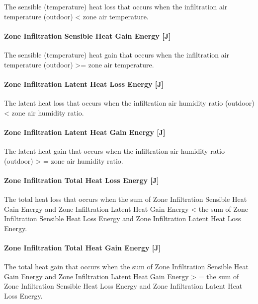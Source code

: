 The sensible (temperature) heat loss that occurs when the infiltration air temperature (outdoor) \textless{} zone air temperature.

\paragraph{Zone Infiltration Sensible Heat Gain Energy {[}J{]}}\label{zone-infiltration-sensible-heat-gain-energy-j}

The sensible (temperature) heat gain that occurs when the infiltration air temperature (outdoor) \textgreater{}= zone air temperature.

\paragraph{Zone Infiltration Latent Heat Loss Energy {[}J{]}}\label{zone-infiltration-latent-heat-loss-energy-j}

The latent heat loss that occurs when the infiltration air humidity ratio (outdoor) \textless{} zone air humidity ratio.

\paragraph{Zone Infiltration Latent Heat Gain Energy {[}J{]}}\label{zone-infiltration-latent-heat-gain-energy-j}

The latent heat gain that occurs when the infiltration air humidity ratio (outdoor) \textgreater{} = zone air humidity ratio.

\paragraph{Zone Infiltration Total Heat Loss Energy {[}J{]}}\label{zone-infiltration-total-heat-loss-energy-j}

The total heat loss that occurs when the sum of Zone Infiltration Sensible Heat Gain Energy and Zone Infiltration Latent Heat Gain Energy \textless{} the sum of Zone Infiltration Sensible Heat Loss Energy and Zone Infiltration Latent Heat Loss Energy.

\paragraph{Zone Infiltration Total Heat Gain Energy {[}J{]}}\label{zone-infiltration-total-heat-gain-energy-j}

The total heat gain that occurs when the sum of Zone Infiltration Sensible Heat Gain Energy and Zone Infiltration Latent Heat Gain Energy \textgreater{} = the sum of Zone Infiltration Sensible Heat Loss Energy and Zone Infiltration Latent Heat Loss Energy.


